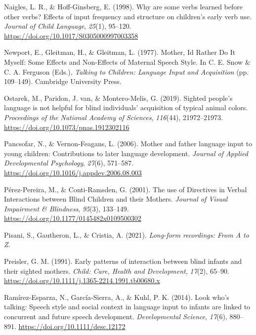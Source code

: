 \documentclass[
  man]{apa6}
\newlength{\cslhangindent}
\newlength{\cslentryspacingunit} %
\newenvironment{CSLReferences}[2] %
 {%
  \setlength{\parindent}{0pt}
  \ifodd #1
  \let\oldpar\par
  \def\par{\hangindent=\cslhangindent\oldpar}
  \fi
  \setlength{\parskip}{#2\cslentryspacingunit}
 }%
 {}
\begin{document}
\begin{CSLReferences}{1}{0}
\leavevmode{}%
Naigles, L. R., \& Hoff-Ginsberg, E. (1998). Why are some verbs learned before other verbs? {Effects} of input frequency and structure on children's early verb use. \emph{Journal of Child Language}, \emph{25}(1), 95--120. \url{https://doi.org/10.1017/S0305000997003358}

\leavevmode{}%
Newport, E., Gleitman, H., \& Gleitman, L. (1977). Mother, {Id Rather Do It Myself}: {Some Effects} and {Non-Effects} of {Maternal Speech Style}. In C. E. Snow \& C. A. Ferguson (Eds.), \emph{Talking to {Children}: {Language Input} and {Acquisition}} (pp. 109--149). Cambridge University Press.

\leavevmode{}%
Ostarek, M., Paridon, J. van, \& Montero-Melis, G. (2019). Sighted people's language is not helpful for blind individuals' acquisition of typical animal colors. \emph{Proceedings of the National Academy of Sciences}, \emph{116}(44), 21972--21973. \url{https://doi.org/10.1073/pnas.1912302116}

\leavevmode{}%
Pancsofar, N., \& Vernon-Feagans, L. (2006). Mother and father language input to young children: {Contributions} to later language development. \emph{Journal of Applied Developmental Psychology}, \emph{27}(6), 571--587. \url{https://doi.org/10.1016/j.appdev.2006.08.003}

\leavevmode{}%
Pérez-Pereira, M., \& Conti-Ramsden, G. (2001). The use of {Directives} in {Verbal Interactions} between {Blind Children} and their {Mothers}. \emph{Journal of Visual Impairment \& Blindness}, \emph{95}(3), 133--149. \url{https://doi.org/10.1177/0145482x0109500302}

\leavevmode{}%
Pisani, S., Gautheron, L., \& Cristia, A. (2021). \emph{Long-form recordings: {From A} to {Z}}.

\leavevmode{}%
Preisler, G. M. (1991). Early patterns of interaction between blind infants and their sighted mothers. \emph{Child: Care, Health and Development}, \emph{17}(2), 65--90. \url{https://doi.org/10.1111/j.1365-2214.1991.tb00680.x}

\leavevmode{}%
Ramírez-Esparza, N., García-Sierra, A., \& Kuhl, P. K. (2014). Look who's talking: Speech style and social context in language input to infants are linked to concurrent and future speech development. \emph{Developmental Science}, \emph{17}(6), 880--891. \url{https://doi.org/10.1111/desc.12172}


\end{CSLReferences}
\end{document}
